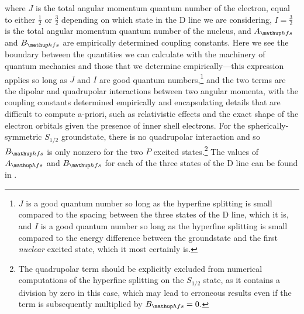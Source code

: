 where $J$ is the total angular momentum quantum number of the electron, equal to either $\frac12$ or $\frac32$ depending on which state in the D line we are considering, $I=\frac32$ is the total angular momentum quantum number of the nucleus, and $A_\up{hfs}$ and $B_\up{hfs}$ are empirically determined coupling constants. Here we see the boundary between the quantities we can calculate with the machinery of quantum mechanics and those that we determine empirically---this expression applies so long as $J$ and $I$ are good quantum numbers,\footnote{$J$ is a good quantum number so long as the hyperfine splitting is small compared to the spacing between the three states of the D line, which it is, and $I$ is a good quantum number so long as the hyperfine splitting is small compared to the energy difference between the groundstate and the first \emph{nuclear} excited state, which it most certainly is.} and the two terms are the dipolar and quadrupolar interactions \cite{arimondo_experimental_1977} between two angular momenta, with the coupling constants determined empirically and encapsulating details that are difficult to compute a-priori, such as relativistic effects and the exact shape of the electron orbitals given the presence of inner shell electrons. For the spherically-symmetric $S_{1/2}$ groundstate, there is no quadrupolar interaction and so $B_\up{hfs}$ is only nonzero for the two $P$ excited states.\footnote{The quadrupolar term should be explicitly excluded from numerical computations of the hyperfine splitting on the $S_{1/2}$ state, as it contains a division by zero in this case, which may lead to erroneous results even if the term is subsequently multiplied by $B_\up{hfs}=0$.} The values of $A_\up{hfs}$ and $B_\up{hfs}$ for each of the three states of the D line can be found in \cite{steck_rubidium_2015}.

